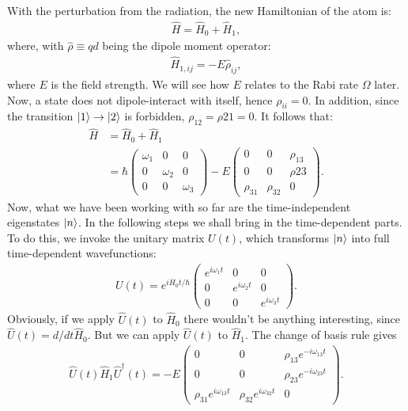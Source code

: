\documentclass{article}
\theoremstyle{definition}
\begin{document}
With the perturbation from the radiation, the new Hamiltonian of the atom is:
\begin{align}
\hat{H} = \hat{H}_0 + \hat{H}_1,
\end{align}
where, with $\hat{\rho} \equiv qd$ being the dipole moment operator:
\begin{align}
\hat{H}_{1,ij} = -E\hat{\rho}_{ij},
\end{align}
where $E$ is the field strength. We will see how $E$ relates to the Rabi rate $\Omega$ later. Now, a state does not dipole-interact with itself, hence $\rho_{ii} = 0$. In addition, since the transition $\ket{1} \rightarrow \ket{2}$ is forbidden, $\rho_{12} = \rho{21} = 0$. It follows that:
\begin{align}
\hat{H} &= \hat{H}_0 + \hat{H}_1 \nonumber\\
&= \hbar\begin{pmatrix}
\omega_1 & 0 & 0\\
0 & \omega_2 & 0\\
0 & 0 & \omega_3
\end{pmatrix} -
E\begin{pmatrix}
0 & 0 & \rho_{13}\\
0 & 0 & \rho{23}\\
\rho_{31} & \rho_{32} & 0
\end{pmatrix}.
\end{align}
Now, what we have been working with so far are the time-independent eigenstates $\ket{n}$. In the following steps we shall bring in the time-dependent parts. To do this, we invoke the unitary matrix $U(t)$, which transforms $\ket{n}$ into full time-dependent wavefunctions:
\begin{align}
U(t) = e^{iH_0t/\hbar}
\begin{pmatrix}
e^{i\omega_1t} & 0 & 0\\
0 & e^{i\omega_2t} & 0\\
0 & 0 & e^{i\omega_3t}
\end{pmatrix}.
\end{align} 
Obviously, if we apply $\hat{U}(t)$ to $\hat{H}_0$ there wouldn't be anything interesting, since $\hat{U}(t) = d/dt\hat{H}_0$. But we can apply $\hat{U}(t)$ to $\hat{H}_1$. The change of basis rule gives
\begin{align}
\hat{U}(t)\hat{H}_1\hat{U}^{\dagger}(t) = 
-E\begin{pmatrix}
0 & 0 & \rho_{13}e^{-i\omega_{13}t}\\
0 & 0 & \rho_{23}e^{-i\omega_{23}t}\\
\rho_{31}e^{i\omega_{13}t} & \rho_{32}e^{i\omega_{32}t} & 0
\end{pmatrix}.
\end{align}
\end{document}
